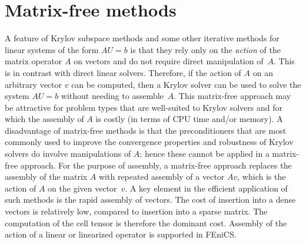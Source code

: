 \section{Matrix-free methods}

A feature of Krylov subspace methods and some other iterative methods
for linear systems of the form $AU = b$ is that they rely only on the
\emph{action} of the matrix operator $A$ on vectors and do not require
direct manipulation of~$A$. This is in contrast with direct linear
solvers. Therefore, if the action of $A$ on an arbitrary vector $v$
can be computed, then a Krylov solver can be used to solve the system
$AU = b$ without needing to assemble~$A$. This matrix-free approach
may be attractive for problem types that are well-suited to Krylov
solvers and for which the assembly of $A$ is costly (in terms of CPU
time and/or memory).  A disadvantage of matrix-free methods is that
the preconditioners that are most commonly used to improve the
convergence properties and robustness of Krylov solvers do involve
manipulations of $A$; hence these cannot be applied in a matrix-free
approach. For the purpose of assembly, a matrix-free approach replaces
the assembly of the matrix $A$ with repeated assembly of a vector
$Av$, which is the action of $A$ on the given vector~$v$. A key
element in the efficient application of such methods is the rapid
assembly of vectors. The cost of insertion into a dense vectors is
relatively low, compared to insertion into a sparse matrix. The
computation of the cell tensor is therefore the dominant
cost. Assembly of the action of a linear or linearized operator is
supported in FEniCS.

